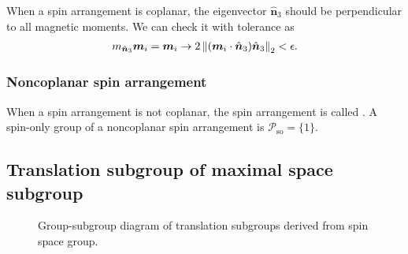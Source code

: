 When a spin arrangement is coplanar, the eigenvector $\hat{\bm{n}}_{3}$ should be perpendicular to all magnetic moments.
We can check it with tolerance as
\begin{align}
  m_{\hat{\bm{n}}_{3}} \bm{m}_{i} = \bm{m}_{i}
  \rightarrow
  2 \left\lVert (\bm{m}_{i} \cdot \hat{\bm{n}}_{3}) \hat{\bm{n}}_{3}\right\rVert_{2} < \epsilon.
\end{align}

\subsubsection{Noncoplanar spin arrangement}

When a spin arrangement is not coplanar, the spin arrangement is called .
A spin-only group of a noncoplanar spin arrangement is $\mathcal{P}_{\mathrm{so}} = \{ 1 \}$.

\subsection{Translation subgroup of maximal space subgroup}

\begin{figure}
  \centering
  \caption{\label{fig:translation_subgroup}Group-subgroup diagram of translation subgroups derived from spin space group.}
\end{figure}

